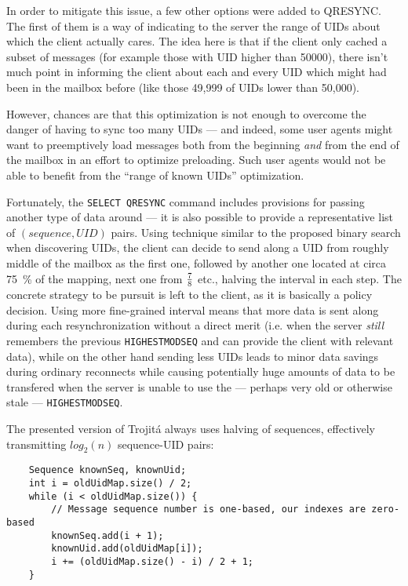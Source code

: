 \documentclass[trojita]{subfiles}
\begin{document}
In order to mitigate this issue, a few other options were added to QRESYNC.  The first of them is a way of indicating to
the server the range of UIDs about which the client actually cares.  The idea here is that if the client only cached a
subset of messages (for example those with UID higher than 50000), there isn't much point in informing the client about
each and every UID which might had been in the mailbox before (like those 49,999 of UIDs lower than 50,000).

However, chances are that this optimization is not enough to overcome the danger of having to sync too many UIDs --- and
indeed, some user agents might want to preemptively load messages both from the beginning {\em and} from the end of the
mailbox in an effort to optimize preloading.  Such user agents would not be able to benefit from the ``range of known
UIDs'' optimization.

Fortunately, the {\tt SELECT QRESYNC} command includes provisions for passing another type of data around --- it is also
possible to provide a representative list of $(sequence, UID)$ pairs.  Using technique similar to the proposed binary
search when discovering UIDs, the client can decide to send along a UID from roughly middle of the mailbox as the first
one, followed by another one located at circa 75~\% of the mapping, next one from $7 \over 8$ etc., halving the interval
in each step.  The concrete strategy to be pursuit is left to the client, as it is basically a policy decision.  Using
more fine-grained interval means that more data is sent along during each resynchronization without a direct merit (i.e.
when the server {\em still} remembers the previous {\tt HIGHESTMODSEQ} and can provide the client with relevant data),
while on the other hand sending less UIDs leads to minor data savings during ordinary reconnects while causing
potentially huge amounts of data to be transfered when the server is unable to use the --- perhaps very old or otherwise
stale --- {\tt HIGHESTMODSEQ}.

The presented version of Trojitá always uses halving of sequences, effectively transmitting $log_2(n)$ sequence-UID
pairs:

\begin{verbatim}
    Sequence knownSeq, knownUid;
    int i = oldUidMap.size() / 2;
    while (i < oldUidMap.size()) {
        // Message sequence number is one-based, our indexes are zero-based
        knownSeq.add(i + 1);
        knownUid.add(oldUidMap[i]);
        i += (oldUidMap.size() - i) / 2 + 1;
    }
\end{verbatim}
\end{document}
